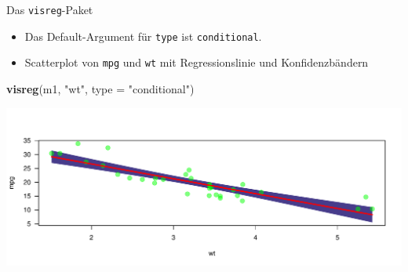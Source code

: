 \documentclass[ignorenonframetext,]{beamer}
\newenvironment{Shaded}{\begin{snugshade}}{\end{snugshade}}
\newcommand{\KeywordTok}[1]{\textcolor[rgb]{0.13,0.29,0.53}{\textbf{#1}}}
\newcommand{\DataTypeTok}[1]{\textcolor[rgb]{0.13,0.29,0.53}{#1}}
\newcommand{\StringTok}[1]{\textcolor[rgb]{0.31,0.60,0.02}{#1}}
\newcommand{\NormalTok}[1]{#1}
\providecommand{\tightlist}{%
  \setlength{\itemsep}{0pt}\setlength{\parskip}{0pt}}
\begin{document}
\begin{frame}[fragile]{Das \texttt{visreg}-Paket}

\begin{itemize}
\tightlist
\item
  Das Default-Argument für \texttt{type} ist \texttt{conditional}.
\item
  Scatterplot von \texttt{mpg} und \texttt{wt} mit Regressionslinie und
  Konfidenzbändern
\end{itemize}

\begin{Shaded}
\begin{Highlighting}[]
\KeywordTok{visreg}\NormalTok{(m1, }\StringTok{"wt"}\NormalTok{, }\DataTypeTok{type =} \StringTok{"conditional"}\NormalTok{)}
\end{Highlighting}
\end{Shaded}

\includegraphics{B3_linreg_files/figure-beamer/unnamed-chunk-30-1.pdf}

\end{frame}
\end{document}
